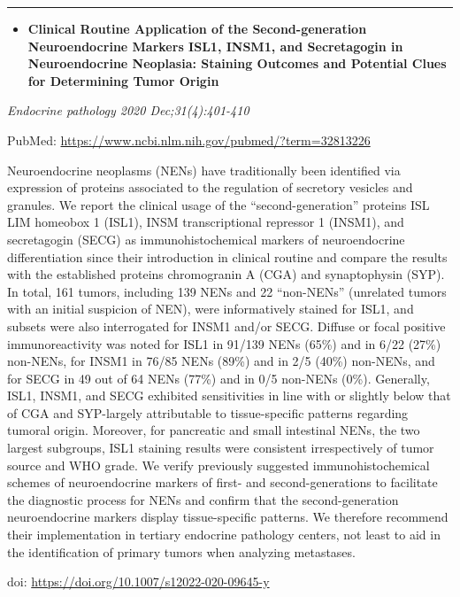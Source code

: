 \documentclass[
]{article}
\providecommand{\tightlist}{%
  \setlength{\itemsep}{0pt}\setlength{\parskip}{0pt}}
\begin{document}
\begin{center}\rule{0.5\linewidth}{0.5pt}\end{center}

\begin{itemize}
\tightlist
\item
  \textbf{Clinical Routine Application of the Second-generation
  Neuroendocrine Markers ISL1, INSM1, and Secretagogin in Neuroendocrine
  Neoplasia: Staining Outcomes and Potential Clues for Determining Tumor
  Origin}
\end{itemize}

\emph{Endocrine pathology 2020 Dec;31(4):401-410}

PubMed: \url{https://www.ncbi.nlm.nih.gov/pubmed/?term=32813226}

Neuroendocrine neoplasms (NENs) have traditionally been identified via
expression of proteins associated to the regulation of secretory
vesicles and granules. We report the clinical usage of the
``second-generation'' proteins ISL LIM homeobox 1 (ISL1), INSM
transcriptional repressor 1 (INSM1), and secretagogin (SECG) as
immunohistochemical markers of neuroendocrine differentiation since
their introduction in clinical routine and compare the results with the
established proteins chromogranin A (CGA) and synaptophysin (SYP). In
total, 161 tumors, including 139 NENs and 22 ``non-NENs'' (unrelated
tumors with an initial suspicion of NEN), were informatively stained for
ISL1, and subsets were also interrogated for INSM1 and/or SECG. Diffuse
or focal positive immunoreactivity was noted for ISL1 in 91/139 NENs
(65\%) and in 6/22 (27\%) non-NENs, for INSM1 in 76/85 NENs (89\%) and
in 2/5 (40\%) non-NENs, and for SECG in 49 out of 64 NENs (77\%) and in
0/5 non-NENs (0\%). Generally, ISL1, INSM1, and SECG exhibited
sensitivities in line with or slightly below that of CGA and SYP-largely
attributable to tissue-specific patterns regarding tumoral origin.
Moreover, for pancreatic and small intestinal NENs, the two largest
subgroups, ISL1 staining results were consistent irrespectively of tumor
source and WHO grade. We verify previously suggested immunohistochemical
schemes of neuroendocrine markers of first- and second-generations to
facilitate the diagnostic process for NENs and confirm that the
second-generation neuroendocrine markers display tissue-specific
patterns. We therefore recommend their implementation in tertiary
endocrine pathology centers, not least to aid in the identification of
primary tumors when analyzing metastases.

doi: \url{https://doi.org/10.1007/s12022-020-09645-y}
\end{document}
